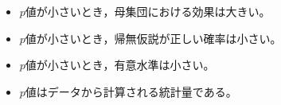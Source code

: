\begin{itemize}
	\item $p$値が小さいとき，母集団における効果は大きい。
	\item $p$値が小さいとき，帰無仮説が正しい確率は小さい。
	\item $p$値が小さいとき，有意水準は小さい。
	\item $p$値はデータから計算される統計量である。
\end{itemize}
